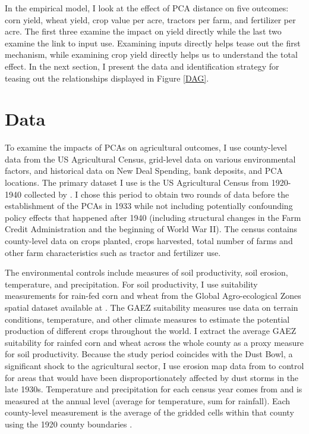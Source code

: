 \documentclass[12pt]{article}
\begin{document}
In the empirical model, I look at the effect of PCA distance on five outcomes: corn yield, wheat yield, crop value per acre, tractors per farm, and fertilizer per acre.
The first three examine the impact on yield directly while the last two examine the link to input use.
Examining inputs directly helps tease out the first mechanism, while examining crop yield directly helps us to understand the total effect. 
In the next section, I present the data and identification strategy for teasing out the relationships displayed in Figure \ref{DAG}.

\section*{Data}
To examine the impacts of PCAs on agricultural outcomes, I use county-level data from the US Agricultural Census, grid-level data on various environmental factors, and historical data on New Deal Spending, bank deposits, and PCA locations.
The primary dataset I use is the US Agricultural Census from 1920-1940 collected by \citet{haines_united_2016}. 
I chose this period to obtain two rounds of data before the establishment of the PCAs in 1933 while not including potentially confounding policy effects that happened after 1940 (including structural changes in the Farm Credit Administration and the beginning of World War II). 
The census contains county-level data on crops planted, crops harvested, total number of farms and other farm characteristics such as tractor and fertilizer use.

The environmental controls include measures of soil productivity, soil erosion, temperature, and precipitation.
For soil productivity, I use suitability measurements for rain-fed corn and wheat from the Global Agro-ecological Zones spatial dataset available at \citet{fao}.
The GAEZ suitability measures use data on terrain conditions, temperature, and other climate measures to estimate the potential production of different crops throughout the world.
I extract the average GAEZ suitability for rainfed corn and wheat across the whole county as a proxy measure for soil productivity.
Because the study period coincides with the Dust Bowl, a significant shock to the agricultural sector, I use erosion map data from \citet{hornbeck_enduring_2012} to control for areas that would have been disproportionately affected by dust storms in the late 1930s. 
Temperature and precipitation for each census year comes from \citet{prism} and is measured at the annual level (average for temperature, sum for rainfall).
Each county-level measurement is the average of the gridded cells within that county using the 1920 county boundaries \citet{nhgis}.
\end{document}

